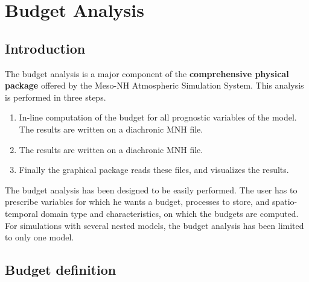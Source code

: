 
\chapter{Budget Analysis}
\minitoc


\section{Introduction}

The budget analysis is a major component of the {\bf comprehensive
physical package} offered by the Meso-NH Atmospheric Simulation System. This
analysis is performed in three steps.

\begin{enumerate}
\item In-line computation of the budget for all prognostic variables of the
model. The results are written on a diachronic MNH file.
\item The results are written on a diachronic MNH file.
\item Finally the graphical package reads these files, and visualizes
the results.
\end{enumerate}

 The budget analysis has been designed to be easily performed. The user has to
prescribe variables for which he wants a budget, processes
to store, and spatio-temporal domain type and characteristics,
on which the budgets are computed. For simulations with several nested models,
the budget analysis has been limited to only one model.

\section{Budget definition}

